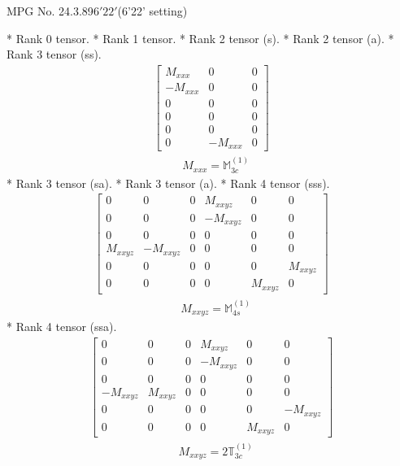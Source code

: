 \documentclass[fleqn,8pt,landscape]{jsarticle}
\begin{document}
\setcounter{MaxMatrixCols}{32}

\renewcommand{\tablename}{Table~}
\renewcommand{\figurename}{Figure~}
\begin{center}
\LARGE
MPG No. 24.3.89\quad$6'22'$\quad(6'22' setting)
\end{center}
* Rank 0 tensor.
* Rank 1 tensor.
* Rank 2 tensor (s).
* Rank 2 tensor (a).
* Rank 3 tensor (ss).
\begin{align*}
\begin{bmatrix} M_{xxx} & 0 & 0 \\ - M_{xxx} & 0 & 0 \\ 0 & 0 & 0 \\ 0 & 0 & 0 \\ 0 & 0 & 0 \\ 0 & - M_{xxx} & 0 \end{bmatrix}
\end{align*}
\begin{align*}
& M_{xxx} = \mathbb{M}_{3c}^{(1)}
\end{align*}
* Rank 3 tensor (sa).
* Rank 3 tensor (a).
* Rank 4 tensor (sss).
\begin{align*}
\begin{bmatrix} 0 & 0 & 0 & M_{xxyz} & 0 & 0 \\ 0 & 0 & 0 & - M_{xxyz} & 0 & 0 \\ 0 & 0 & 0 & 0 & 0 & 0 \\ M_{xxyz} & - M_{xxyz} & 0 & 0 & 0 & 0 \\ 0 & 0 & 0 & 0 & 0 & M_{xxyz} \\ 0 & 0 & 0 & 0 & M_{xxyz} & 0 \end{bmatrix}
\end{align*}
\begin{align*}
& M_{xxyz} = \mathbb{M}_{4s}^{(1)}
\end{align*}
* Rank 4 tensor (ssa).
\begin{align*}
\begin{bmatrix} 0 & 0 & 0 & M_{xxyz} & 0 & 0 \\ 0 & 0 & 0 & - M_{xxyz} & 0 & 0 \\ 0 & 0 & 0 & 0 & 0 & 0 \\ - M_{xxyz} & M_{xxyz} & 0 & 0 & 0 & 0 \\ 0 & 0 & 0 & 0 & 0 & - M_{xxyz} \\ 0 & 0 & 0 & 0 & M_{xxyz} & 0 \end{bmatrix}
\end{align*}
\begin{align*}
& M_{xxyz} = 2 \mathbb{T}_{3c}^{(1)}
\end{align*}
\end{document}
